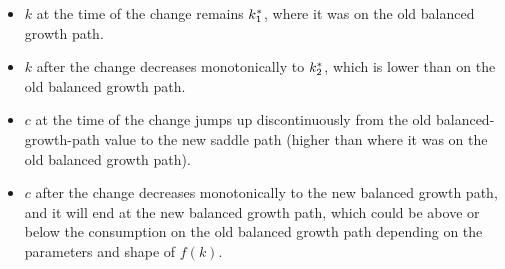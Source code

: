 \documentclass[12pt]{article}
\begin{document}
\newpage{}

\begin{itemize}
    \item $k$ at the time of the change remains $k^*_1$, where it was on the old balanced growth path.
    \item $k$ after the change decreases monotonically to $k^*_2$, which is lower than on the old balanced growth path.
    \item $c$ at the time of the change jumps up discontinuously from the old balanced-growth-path value to the new saddle path (higher than where it was on the old balanced growth path).
    \item $c$ after the change decreases monotonically to the new balanced growth path, and it will end at the new balanced growth path, which could be above or below the consumption on the old balanced growth path depending on the parameters and shape of $f(k)$.
\end{itemize}
\end{document}
